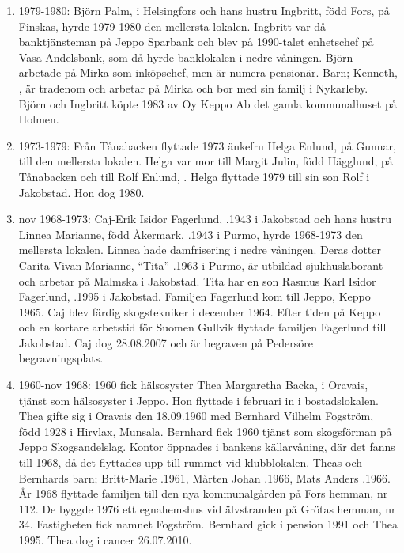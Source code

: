 \begin{enumerate}
  \item 1979-1980: Björn Palm,  i Helsingfors och hans hustru Ingbritt, född Fors,  på Finskas, hyrde 1979-1980 den mellersta lokalen. Ingbritt var då banktjänsteman på Jeppo Sparbank och blev på 1990-talet enhetschef på Vasa Andelsbank, som då hyrde banklokalen i nedre våningen. Björn arbetade på Mirka som inköpschef, men är numera pensionär.
  Barn; Kenneth, , är tradenom och arbetar på Mirka och bor med sin familj i Nykarleby. Björn och Ingbritt köpte 1983 av Oy Keppo Ab det gamla kommunalhuset på Holmen.
  \item 1973-1979: Från Tånabacken flyttade 1973 änkefru Helga Enlund,  på Gunnar, till den mellersta lokalen. Helga var mor till Margit Julin, född Hägglund,  på Tånabacken och till Rolf Enlund, . Helga flyttade 1979 till sin son Rolf i Jakobstad. Hon dog 1980.
  \item nov 1968-1973: Caj-Erik Isidor Fagerlund, .1943 i Jakobstad och hans hustru Linnea Marianne, född Åkermark, .1943 i Purmo, hyrde 1968-1973  den mellersta lokalen. Linnea hade damfrisering i nedre våningen. Deras dotter Carita Vivan Marianne, ``Tita'' .1963 i Purmo, är utbildad sjukhuslaborant och arbetar på Malmska i Jakobstad. Tita har en son Rasmus Karl Isidor Fagerlund, .1995 i Jakobstad.  Familjen Fagerlund kom till Jeppo, Keppo 1965. Caj blev färdig skogstekniker i december 1964. Efter tiden på Keppo och	 en kortare arbetstid för Suomen Gullvik flyttade familjen Fagerlund till Jakobstad. Caj dog 28.08.2007 och är begraven på Pedersöre begravningsplats.
  \item 1960-nov 1968: 1960 fick hälsosyster Thea Margaretha Backa,  i Oravais, tjänst som hälsosyster i Jeppo. Hon flyttade i februari in i	bostadslokalen. Thea gifte sig i Oravais den 18.09.1960 med Bernhard	Vilhelm Fogström, född 1928 i Hirvlax, Munsala. Bernhard fick 1960 	tjänst som skogsförman på Jeppo Skogsandelslag. Kontor öppnades i 	bankens källarvåning, där det fanns till 1968, då det flyttades upp till rummet vid klubblokalen. Theas och Bernhards barn;	Britt-Marie	.1961, Mårten Johan .1966, Mats Anders	.1966.	År 1968 flyttade familjen till den nya kommunalgården på Fors hemman,	nr 112. De byggde 1976 ett egnahemshus vid älvstranden på Grötas hemman, nr 34. Fastigheten fick namnet Fogström. Bernhard gick i pension 1991 och Thea 1995. Thea dog i cancer 26.07.2010.
\end{enumerate}

